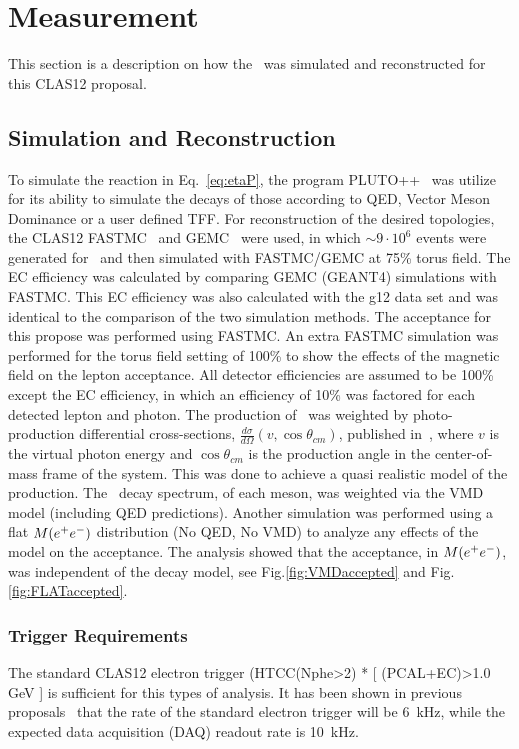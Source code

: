 \section{Measurement}\label{sec:measurement}
This section is a description on how the \etaDal \ was simulated and reconstructed for this CLAS12 proposal.
\subsection{Simulation and Reconstruction}
To simulate the reaction in Eq.~\ref{eq:etaP}, the program PLUTO++~\cite{PLUTO} was utilize for its ability to simulate the decays of those according to QED, Vector Meson Dominance or a user defined TFF. For reconstruction of the desired topologies, the CLAS12 FASTMC~\cite{fastmc} and GEMC~\cite{gemc} were used, in which $\sim 9\cdot10^6$ events were generated for \etaPDal \ and then simulated with FASTMC/GEMC at 75\% torus field. The EC efficiency was calculated by comparing GEMC (GEANT4) simulations with FASTMC. This EC efficiency was also calculated with the g12 data set and was identical to the comparison of the two simulation methods. The acceptance for this propose was performed using FASTMC. \newline
\indent An extra FASTMC simulation was performed for the torus field setting of 100\% to show the effects of the magnetic field on the lepton acceptance. All detector efficiencies are assumed to be 100\% except the EC efficiency, in which an efficiency of 10\% was factored for each detected lepton and photon. \newline
\indent The production of \etaTP \ was weighted by photo-production differential cross-sections, $\frac{d\sigma}{d\Omega}(v,\cos\theta_{cm})$, published in~\cite{Williams}, where $v$ is the virtual photon energy and $\cos\theta_{cm}$ is the production angle in the center-of-mass frame of the system. This was done to achieve a quasi realistic model of the production. The \epemT \  decay spectrum, of each meson, was weighted via the VMD model (including QED predictions). Another simulation was performed using a flat $M(e^+e^-)$ distribution (No QED, No VMD) to analyze any effects of the model on the \epemT acceptance. The analysis showed that the acceptance, in $M(e^+e^-)$, was independent of the decay model, see Fig.\ref{fig:VMDaccepted} and Fig.\ref{fig:FLATaccepted}.
\subsubsection{Trigger Requirements}
The standard CLAS12 electron trigger (HTCC(Nphe>2) * [ (PCAL+EC)>1.0 GeV ] is sufficient for this types of analysis. It has been shown in previous
proposals~\cite{clas.proposal.meson,clas.proposal.jpsi} that the rate of the standard electron trigger will be 6~kHz, while the expected data acquisition (DAQ) readout rate is 10~kHz.
